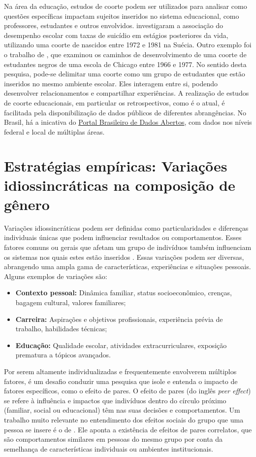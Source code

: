 Na área da educação, estudos de coorte podem ser utilizados para analisar como questões específicas impactam sujeitos inseridos no sistema educacional, como professores, estudantes e outros envolvidos. \citet{Bjorkenstam993} investigaram a associação do desempenho escolar com taxas de suicídio em estágios posteriores da vida, utilizando uma coorte de nascidos entre 1972 e 1981 na Suécia. Outro exemplo foi o trabalho de \citet{Ensminger1992}, que examinou os caminhos de desenvolvimento de uma coorte de estudantes negros de uma escola de Chicago entre 1966 e 1977. No sentido desta pesquisa, pode-se delimitar uma coorte como um grupo de estudantes que estão inseridos no mesmo ambiente escolar. Eles interagem entre si, podendo desenvolver relacionamentos e compartilhar experiências. A realização de estudos de coorte educacionais, em particular os retrospectivos, como é o atual, é facilitada pela disponibilização de dados públicos de diferentes abrangências. No Brasil, há a inicativa do \href{https://dados.gov.br/home}{Portal Brasileiro de Dados Abertos}, com dados nos níveis federal e local de múltiplas áreas. 


\section{Estratégias empíricas: Variações idiossincráticas na composição de gênero}
\label{sec:variacoes}
Variações idiossincráticas podem ser definidas como particularidades e diferenças individuais únicas que podem influenciar resultados ou comportamentos. Esses fatores comuns ou gerais que afetam um grupo de indivíduos também influenciam os sistemas nos quais estes estão inseridos \autocite{Meister1991}. Essas variações podem ser diversas, abrangendo uma ampla gama de características, experiências e situações pessoais. Alguns exemplos de variações são:

\begin{itemize}
  \item \textbf{Contexto pessoal:} Dinâmica familiar, status socioeconômico, crenças, bagagem cultural, valores familiares;
  \item \textbf{Carreira:} Aspirações e objetivos profissionais, experiência prévia de trabalho, habilidades técnicas; 
  \item \textbf{Educação:} Qualidade escolar, atividades extracurriculares, exposição prematura a tópicos avançados. 
\end{itemize}

Por serem altamente individualizadas e frequentemente envolverem múltiplos fatores, é um desafio conduzir uma pesquisa que isole e entenda o impacto de fatores específicos, como o efeito de pares. O efeito de pares (do inglês \textit{peer effect}) se refere à influência e impactos que indivíduos dentro do círculo próximo (familiar, social ou educacional) têm nas suas decisões e comportamentos. Um trabalho muito relevante no entendimento dos efeitos sociais do grupo que uma pessoa se insere é o de \citet{Manski1993}. Ele aponta a existência de efeitos de pares correlatos, que são comportamentos similares em pessoas do mesmo grupo por conta da semelhança de características individuais ou ambientes institucionais.

